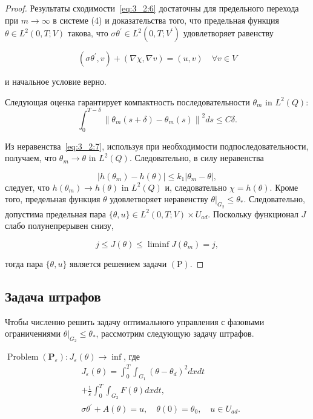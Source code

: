 \begin{proof}
    Результаты сходимости~\eqref{eq:3_2:6} достаточны для предельного перехода
    при $m \rightarrow \infty$ в системе (4) и доказательства того,
    что предельная функция $\theta \in L^{2}(0, T ; V) $ такова,
    что $\sigma \theta^{\prime} \in L^{2}\left(0, T ; V^{\prime}\right)$
    удовлетворяет равенству

    \[ \left(\sigma \theta^{\prime}, v\right)+(\nabla \chi, \nabla v)=(u, v) \quad \forall v \in V \]

    и начальное условие верно.

    Следующая оценка гарантирует компактность последовательности $\theta_{m}$ in $L^{2}(Q)$:
    \begin{equation}
        \label{eq:3_2:7}
        \int_{0}^{T-\delta}\left\|\theta_{m}(s+\delta)-\theta_{m}(s)\right\|^{2} d s \leq C \delta.
    \end{equation}

    Из неравенства~\eqref{eq:3_2:7}, используя при необходимости подпоследовательности,
    получаем, что $\theta_{m} \rightarrow \theta$ in $L^{2}(Q)$.
    Следовательно, в силу неравенства

    \[ \left|h\left(\theta_{m}\right)-h(\theta)\right|
    \leq k_{1}\left|\theta_{m}-\theta\right|, \]
    следует, что $h\left(\theta_{m}\right) \rightarrow h(\theta)$ in $L^{2}(Q)$
    и, следовательно $\chi=h(\theta)$.
    Кроме того, предельная функция $\theta$ удовлетворяет неравенству
    $\left.\theta\right|_{G_{2}} \leq \theta_{*}$.
    Следовательно, допустима предельная пара
    $\{\theta, u\} \in L^{2}(0, T ; V) \times U_{a d}$.
    Поскольку функционал $J$ слабо полунепрерывен снизу,

    \[ j \leq J(\theta) \leq \liminf J\left(\theta_{m}\right)=j, \]

    тогда пара $\{\theta, u\}$ является решением задачи $(\mathrm{P})$.
\end{proof}

\subsection{Задача штрафов}
\label{subsec:ch3/sec2/penalty}
Чтобы численно решить задачу оптимального управления с фазовыми ограничениями
$\left.\theta\right|_{G_{2}} \leq \theta_{*}$, рассмотрим следующую задачу штрафов.

$\operatorname{Problem}\left(\mathbf{P}_{\varepsilon}\right):
J_{\varepsilon}(\theta) \rightarrow \inf$,
где
\[
    \begin{aligned}
        & J_{\varepsilon}(\theta)=\int_{0}^{T}
        \int_{G_{1}}\left(\theta-\theta_{d}\right)^{2} d x d t \\
        & +\frac{1}{\varepsilon} \int_{0}^{T}
        \int_{G_{2}} F(\theta) d x d t, \\
        & \sigma \theta^{\prime}+A(\theta)=u,
        \quad \theta(0)=\theta_{0}, \quad u \in U_{a d}.
    \end{aligned}
\]

